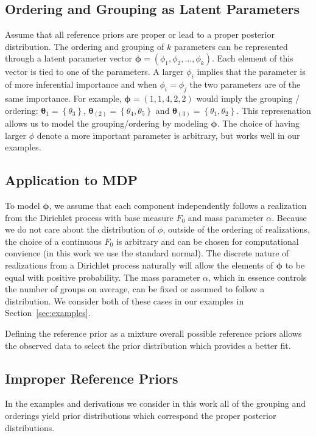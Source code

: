 \documentclass[11pt,a4paper,notitlepage]{article}
\begin{document}
\subsection{Ordering and Grouping as Latent Parameters}
Assume that all reference priors are proper or lead to a proper
posterior distribution.  The ordering and grouping of $k$ parameters
can be represented through a latent parameter vector
$\boldsymbol{\phi} = (\phi_1, \phi_2, \ldots, \phi_k)$. Each element
of this vector is tied to one of the parameters.  A larger $\phi_i$
implies that the parameter is of more inferential importance and when
$\phi_i = \phi_j$ the two parameters are of the same importance.  For
example, $\boldsymbol{\phi} = (1,1,4,2,2)$ would imply the grouping /
ordering: $\boldsymbol{\theta}_{1} = \left\{\theta_3\right\}$,
$\boldsymbol{\theta}_{(2)} = \left\{\theta_4,\theta_5\right\}$ and
$\boldsymbol{\theta}_{(3)} = \left\{\theta_1,\theta_2\right\}$.  This
represenation allows us to model the grouping/ordering by modeling
$\boldsymbol{\phi}$.  The choice of having larger $\phi$ denote a more
important parameter is arbitrary, but works well in our examples.

\subsection{Application to MDP}
To model $\boldsymbol{\phi}$, we assume that each component
independently follows a realization from the Dirichlet process with
base measure $F_0$ and mass parameter $\alpha$.  Because we do not
care about the distribution of $\phi$, outside of the ordering of
realizations, the choice of a continuous $F_0$ is arbitrary and can be
chosen for computational convience (in this work we use the standard
normal).  The discrete nature of realizations from a Dirichlet process
naturally will allow the elements of $\boldsymbol{\phi}$ to be equal
with positive probability.  The mass parameter $\alpha$, which in
essence controls the number of groups on average, can be fixed or
assumed to follow a distribution.  We consider both of these cases in
our examples in Section~\ref{sec:examples}.


Defining the reference prior as a mixture overall possible reference
priors allows the observed data to select the prior distribution which
provides a better fit.  

\subsection{Improper Reference Priors}
In the examples and derivations we consider in this work all of the
grouping and orderings yield prior distributions which correspond the
proper posterior distributions.  
\end{document}
